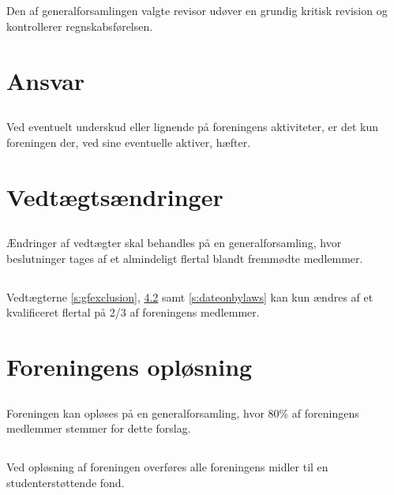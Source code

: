 \documentclass[danish,a4paper,twocolumn,oneside,article]{memoir}
\begin{document}
\section{} Den af generalforsamlingen valgte revisor udøver en grundig kritisk revision og kontrollerer
regnskabsførelsen.


\chapter{Ansvar}

\section{} Ved eventuelt underskud eller lignende på foreningens aktiviteter, er det kun foreningen der, ved
sine eventuelle aktiver, hæfter.


\chapter{Vedtægtsændringer}

\section{} Ændringer af vedtægter skal behandles på en generalforsamling, hvor beslutninger tages af et almindeligt flertal blandt fremmødte medlemmer.

\section{} Vedtægterne \ref{s:gfexclusion}, \ref{s:disbandmentmoney} samt \ref{s:dateonbylaws} kan kun ændres af et kvalificeret flertal på 2/3 af
foreningens medlemmer.


\chapter{Foreningens opløsning}

\section{} Foreningen kan opløses på en generalforsamling, hvor 80\% af foreningens medlemmer stemmer
for dette forslag.

\section{}\label{s:disbandmentmoney} Ved opløsning af foreningen overføres alle foreningens midler til en studenterstøttende fond.
\end{document}
